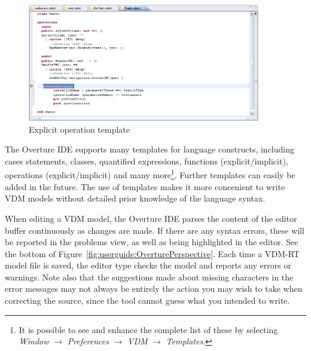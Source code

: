 \begin{figure}
	\begin{center}
	\includegraphics[width=4in]{figures/OperationTemplateRT}
	\caption{Explicit operation template}
	\label{fig:userguide:operationTemplate}
	\end{center}
\end{figure}

The Overture IDE supports many templates for language constructs,
including cases statements, classes, quantified expressions, functions
(explicit/implicit), operations (explicit/implicit) and many
more\footnote{It is possible to see and enhance the complete list of
  these by selecting \emph{Window} $\rightarrow$ \emph{Preferences}
  $\rightarrow$ \emph{VDM}  $\rightarrow$ \emph{Templates}.}. 
Further templates can easily be added in the future. The use of
templates makes it more concenient to write VDM models without
detailed prior knowledge of the language syntax.

When editing a VDM model, the Overture IDE parses the content of the
editor buffer continuously as changes are made. If there are any
syntax errors, these will be reported in the problems view, as well as
being highlighted in the editor. See the bottom of
Figure~\ref{fig:userguide:OverturePerspective}. Each time a
VDM-RT model file is saved, the editor type checks the model and reports
any errors or warnings. Note also that the suggestions made about
missing characters in the
error messages may not always be entirely the action you may wish to
take when correcting the source, since the tool cannot guess what you
intended to write.




